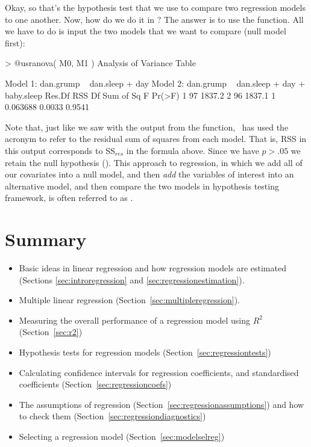 Okay, so that's the hypothesis test that we use to compare two regression models to one another. Now, how do we do it in \R? The answer is to use the  function. All we have to do is input the two models that we want to compare (null model first):
\begin{rblock1}
> @usr{anova( M0, M1 )}
Analysis of Variance Table

Model 1: dan.grump ~ dan.sleep + day
Model 2: dan.grump ~ dan.sleep + day + baby.sleep
  Res.Df    RSS Df Sum of Sq      F Pr(>F)
1     97 1837.2                           
2     96 1837.1  1  0.063688 0.0033 0.9541
\end{rblock1}
Note that, just like we saw with the output from the  function, \R\ has used the acronym  to refer to the residual sum of squares from each model. That is, RSS in this output corresponds to SS$_{res}$ in the formula above.  Since we have $p>.05$ we retain the null hypothesis ().  This approach to regression, in which we add all of our covariates into a null model, and then {\it add} the variables of interest into an alternative model, and then compare the two models in hypothesis testing framework, is often referred to as .

\section{Summary}

\begin{itemize} \itemsep -2pt
\item Basic ideas in linear regression and how regression models are estimated (Sections \ref{sec:introregression} and \ref{sec:regressionestimation}).
\item Multiple linear regression (Section~\ref{sec:multipleregression}). 
\item Measuring the overall performance of a regression model using $R^2$ (Section~\ref{sec:r2})
\item Hypothesis tests for regression models (Section~\ref{sec:regressiontests})
\item Calculating confidence intervals for regression coefficients, and standardised coefficients (Section~\ref{sec:regressioncoefs})
\item The assumptions of regression (Section~\ref{sec:regressionassumptions}) and how to check them (Section~\ref{sec:regressiondiagnostics})
\item Selecting a regression model (Section~\ref{sec:modelselreg})
\end{itemize}